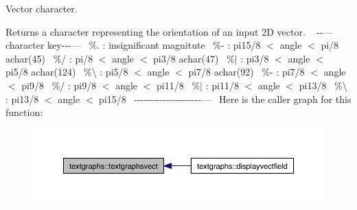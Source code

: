 Vector character. 

Returns a character representing the orientation of an input 2D vector. ~\newline
-\/-\/---character key-\/-\/-\/---~\newline
 \%. \+: insignificant magnitute~\newline
 \%-\/ \+: pi15/8 $<$ angle $<$ pi/8 achar(45)~\newline
 \%/ \+: pi/8 $<$ angle $<$ pi3/8 achar(47)~\newline
 \%$\vert$ \+: pi3/8 $<$ angle $<$ pi5/8 achar(124)~\newline
 \%\textbackslash{} \+: pi5/8 $<$ angle $<$ pi7/8 achar(92)~\newline
 \%-\/ \+: pi7/8 $<$ angle $<$ pi9/8~\newline
 \%/ \+: pi9/8 $<$ angle $<$ pi11/8~\newline
 \%$\vert$ \+: pi11/8 $<$ angle $<$ pi13/8~\newline
 \%\textbackslash{} \+: pi13/8 $<$ angle $<$ pi15/8~\newline
-\/-\/-\/-\/-\/-\/-\/-\/-\/-\/-\/-\/-\/-\/-\/-\/-\/-\/-\/-\/-\/---~\newline
 Here is the caller graph for this function\+:\nopagebreak
\begin{figure}[H]
\begin{center}
\leavevmode
\includegraphics[width=350pt]{namespacetextgraphs_a3ce903686e3a69e50f07b7f1461c53c6_icgraph}
\end{center}
\end{figure}
